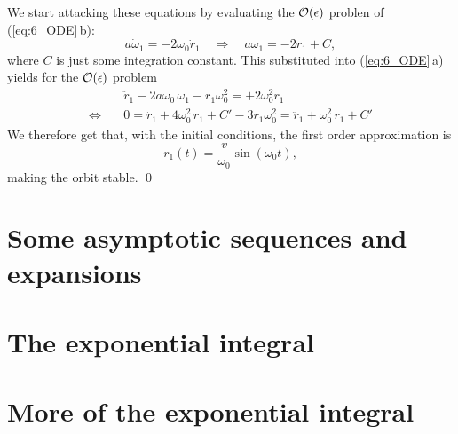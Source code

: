 \documentclass[11pt,letter, swedish, english
]{article}
\begin{document}
We start attacking these equations by evaluating the
$\order{\epsilon}$ problen of (\ref{eq:6_ODE}\,b):
\begin{equation}
a\dot{\omega}_1=-2\omega_0\dot{r}_1 \quad\Longrightarrow\quad
a\omega_1 = -2r_1 + C,
\end{equation}
where $C$ is just some integration constant. This substituted into 
(\ref{eq:6_ODE}\,a) yields for the $\order{\epsilon}$
problem\footnotemark{} 
\begin{equation}
\begin{aligned}
&\ddot{r}_1 - 2a\omega_0\,\omega_1 - r_1\omega_0^2 = +2\omega_0^2r_1\\
\Longleftrightarrow\quad&
0=\ddot{r}_1 + 4\omega_0^2\,r_1 +C' - 3r_1\omega_0^2 = \ddot{r}_1 +
\omega_0^2\,r_1 +C'
\end{aligned}
\end{equation}
We therefore get that, with the initial conditions, the first order
approximation is
\begin{equation}
r_1(t) = \frac{v}{\omega_0}\sin(\omega_0t),
\end{equation}
making the orbit stable.
\qed
{}


\section{Some asymptotic sequences and expansions}


\section{The exponential integral}


\section{More of the exponential integral}
\end{document}
